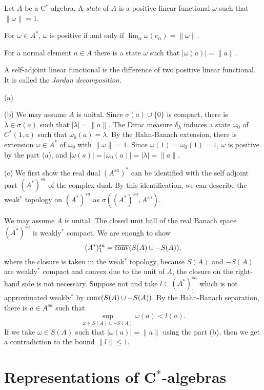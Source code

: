 \documentclass{../../large}
\begin{document}
\begin{prb}
Let $A$ be a C$^*$-algebra.
A \emph{state} of $A$ is a positive linear functional $\omega$ such that $\|\omega\|=1$.
\begin{parts}
\item For $\omega\in A^*$, $\omega$ is positive if and only if $\lim_\alpha\omega(e_\alpha)=\|\omega\|$.
\item For a normal element $a\in A$ there is a state $\omega$ such that $|\omega(a)|=\|a\|$.
\item A self-adjoint linear functional is the difference of two positive linear functional. It is called the \emph{Jordan decomposition}.
\end{parts}
\end{prb}
\begin{pf}
(a)


(b)
We may assume $A$ is unital.
Since $\sigma(a)\cup\{0\}$ is compact, there is $\lambda\in\sigma(a)$ such that $|\lambda|=\|a\|$.
The Dirac measure $\delta_\lambda$ induces a state $\omega_0$ of $C^*(1,a)$ such that $\omega_0(a)=\lambda$.
By the Hahn-Banach extension, there is extension $\omega\in A^*$ of $\omega_0$ with $\|\omega\|=1$.
Since $\omega(1)=\omega_0(1)=1$, $\omega$ is positive by the part (a), and $|\omega(a)|=|\omega_0(a)|=|\lambda|=\|a\|$.

(c)
We first show the real dual $(A^{sa})^*$ can be identified with the self adjoint part $(A^*)^{sa}$ of the complex dual.
By this identification, we can describe the weak$^*$ topology on $(A^*)^{sa}$ as $\sigma((A^*)^{sa},A^{sa})$.

We may assume $A$ is unital.
The closed unit ball of the real Banach space $(A^*)^{sa}$ is weakly$^*$ compact.
We are enough to show
\[(A^*)^{sa}_1=\overline{\operatorname{conv}}(S(A)\cup-S(A)),\]
where the closure is taken in the weak$^*$ topology, because $S(A)$ and $-S(A)$ are weakly$^*$ compact and convex due to the unit of $A$, the closure on the right-hand side is not necessary.
Suppose not and take $l\in(A^*)^{sa}_1$ which is not approximated weakly$^*$ by $\operatorname{conv}(S(A)\cup-S(A))$.
By the Hahn-Banach separation, there is $a\in A^{sa}$ such that
\[\sup_{\omega\in S(A)\cup-S(A)}\omega(a)<l(a).\]
If we take $\omega\in S(A)$ such that $|\omega(a)|=\|a\|$ using the part (b), then we get a contradiction to the bound $\|l\|\le1$.


\end{pf}

\section{Representations of C$^*$-algebras}
\end{document}
